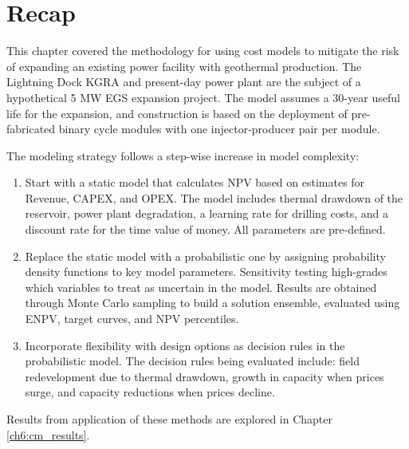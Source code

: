 \section{Recap} \label{ch4:recap}

This chapter covered the methodology for using cost models to mitigate the risk of expanding an existing power facility with geothermal production. The Lightning Dock KGRA and present-day power plant are the subject of a hypothetical 5 MW EGS expansion project. The model assumes a 30-year useful life for the expansion, and construction is based on the deployment of pre-fabricated binary cycle modules with one injector-producer pair per module.

The modeling strategy follows a step-wise increase in model complexity:
\begin{enumerate}
    \item Start with a static model that calculates NPV based on estimates for Revenue, CAPEX, and OPEX. The model includes thermal drawdown of the reservoir, power plant degradation, a learning rate for drilling costs, and a discount rate for the time value of money. All parameters are pre-defined.
    \item Replace the static model with a probabilistic one by assigning probability density functions to key model parameters. Sensitivity testing high-grades which variables to treat as uncertain in the model. Results are obtained through Monte Carlo sampling to build a solution ensemble, evaluated using ENPV, target curves, and NPV percentiles.
    \item Incorporate flexibility with design options as decision rules in the probabilistic model. The decision rules being evaluated include: field redevelopment due to thermal drawdown, growth in capacity when prices surge, and capacity reductions when prices decline.
\end{enumerate}

Results from application of these methods are explored in Chapter \ref{ch6:cm_results}. 